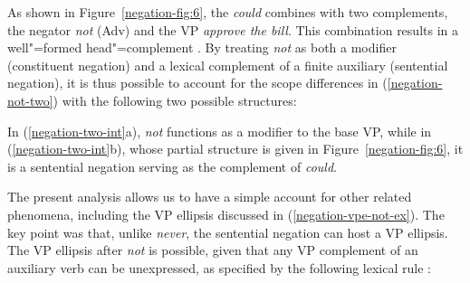 \documentclass[output=paper
 	        ,biblatex
                ,babelshorthands
                ,newtxmath
                ,draftmode
                ,colorlinks, citecolor=brown
]{langscibook}
\begin{document}
\begin{exe}
\begin{xlist}
\begin{exe}
\begin{xlist}
As shown in Figure~\ref{negation-fig:6}, the  \textit{could} combines with two complements, the negator
\textit{not} (Adv) and the VP \textit{approve the bill}.
This combination results in a well"=formed head"=complement .
By treating \textit{not} as both a modifier (constituent negation)
and a lexical complement of a finite auxiliary (sentential negation), it is thus possible to
account for the scope differences in (\ref{negation-not-two}) with the
following two possible structures:

\eal
\label{negation-two-int}
\zl
%
In (\ref{negation-two-int}a), \textit{not} functions as a modifier to
the base VP, while  in (\ref{negation-two-int}b), whose partial structure is
given in Figure~\ref{negation-fig:6}, it is a sentential
negation serving as the complement of \emph{could}.

The present analysis allows us to have a simple account for other related phenomena,
including the VP ellipsis discussed in (\ref{negation-vpe-not-ex}). The key point
was that, unlike \textit{never}, the sentential negation can
host a VP ellipsis.  The VP ellipsis after \textit{not} is
possible, given that any VP complement of an auxiliary
verb can be unexpressed, as
specified by the following lexical rule \parencites[\iaddpages]{Kim:00}[]{kimmichaelis:2020}:



\end{xlist}
\end{exe}
\end{xlist}
\end{exe}
\end{document}

